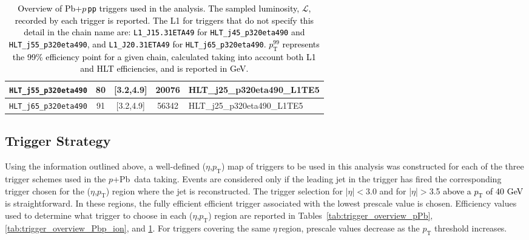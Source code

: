 \documentclass[NOTE, atlasdraft=true, texlive=2020, UKenglish]{atlasdoc}
\newcommand{\PT}{$p_{\text{T}}$}
\newcommand{\PTE}{p_{\text{T}}}
\newcommand{\ETA}{$\eta$}
\newcommand{\pxPb}{$p$+Pb}
\newcommand{\Pbxp}{Pb+$p$}
\begin{document}
\begin{table}[!ht]
\begin{tabular}{ | c | c | c | c | c |}
            \hline
            \multicolumn{1}{|l|}{\texttt{HLT\_j55\_p320eta490}}   & 80  & [3.2,4.9]   & 20076 &  \multicolumn{1}{l|}{\scriptsize HLT\_j25\_p320eta490\_L1TE5}\\
            \hline
            \multicolumn{1}{|l|}{\texttt{HLT\_j65\_p320eta490}}   & 91  & [3.2,4.9]   & 56342 &  \multicolumn{1}{l|}{\scriptsize HLT\_j25\_p320eta490\_L1TE5}\\
            \hline
        \end{tabular}
        \vspace{2mm}
        \caption{
        \textcolor{black}{
        Overview of \Pbxp\,\texttt{pp} triggers used in the analysis. The sampled luminosity, $\mathscr{L}$, recorded by each trigger is reported. The L1 for triggers that do not specify this detail in the chain name are: \texttt{L1\_J15.31ETA49} for \texttt{HLT\_j45\_p320eta490} and \texttt{HLT\_j55\_p320eta490}, and \texttt{L1\_J20.31ETA49} for \texttt{HLT\_j65\_p320eta490}. $\PTE^{99}$ represents the 99\% efficiency point for a given chain, calculated taking into account both L1 and HLT efficiencies, and is reported in GeV. 
        }
        }
        \label{tab:trigger_overview_Pbp_pp}
\end{table}

\subsection{Trigger Strategy}
\label{sec:FTS}
Using the information outlined above, a well-defined (\ETA,\PT{}) map of triggers to be used in this analysis was constructed for each of the three trigger schemes used in the \pxPb\, data taking. Events are considered only if the leading jet in the trigger has fired the corresponding trigger chosen for the (\ETA,\PT{}) region where the jet is reconstructed. 
The trigger selection for |\ETA|$<$3.0 and for |\ETA|$>$3.5 
\textcolor{black}{
above a \PT{ }of 40 GeV
}
is straightforward. In these regions, the fully efficient efficient trigger associated with the lowest prescale value is chosen. Efficiency values used to determine what trigger to choose in each (\ETA,\PT{}) region are reported in Tables~\ref{tab:trigger_overview_pPb}, \ref{tab:trigger_overview_Pbp_ion}, and \ref{tab:trigger_overview_Pbp_pp}. For triggers covering the same \ETA\,region, prescale values decrease as the \PT{ }threshold increases. 
\end{document}

